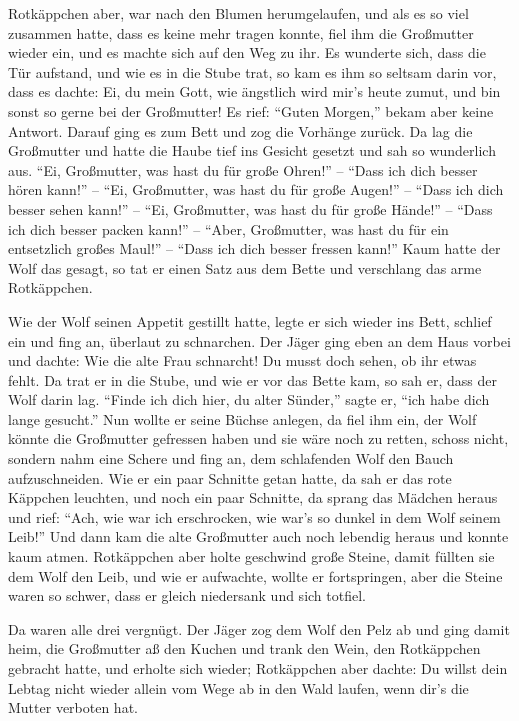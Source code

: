 \documentclass[version=last,paper=A4,fontsize=20pt,DIV=16]{scrartcl}
\newcommand{\gf}[1]{\enquote{\sffamily #1}}
\begin{document}
Rotkäppchen aber, war nach den Blumen herumgelaufen, und als es so viel zusammen hatte, dass es keine mehr tragen konnte, fiel ihm die Großmutter wieder ein, und es machte sich auf den Weg zu ihr. Es wunderte sich, dass die Tür aufstand, und wie es in die Stube trat, so kam es ihm so seltsam darin vor, dass es dachte: Ei, du mein Gott, wie ängstlich wird mir's heute zumut, und bin sonst so gerne bei der Großmutter! Es rief: \gf{Guten Morgen,} bekam aber keine Antwort. Darauf ging es zum Bett und zog die Vorhänge zurück. Da lag die Großmutter und hatte die Haube tief ins Gesicht gesetzt und sah so wunderlich aus. \gf{Ei, Großmutter, was hast du für große Ohren!} -- \gf{Dass ich dich besser hören kann!} -- \gf{Ei, Großmutter, was hast du für große Augen!} -- \gf{Dass ich dich besser sehen kann!} -- \gf{Ei, Großmutter, was hast du für große Hände!} -- \gf{Dass ich dich besser packen kann!} -- \gf{Aber, Großmutter, was hast du für ein entsetzlich großes Maul!} -- \gf{Dass ich dich besser fressen kann!} Kaum hatte der Wolf das gesagt, so tat er einen Satz aus dem Bette und verschlang das arme Rotkäppchen.


Wie der Wolf seinen Appetit gestillt hatte, legte er sich wieder ins Bett, schlief ein und fing an, überlaut zu schnarchen. Der Jäger ging eben an dem Haus vorbei und dachte: Wie die alte Frau schnarcht! Du musst doch sehen, ob ihr etwas fehlt. Da trat er in die Stube, und wie er vor das Bette kam, so sah er, dass der Wolf darin lag. \gf{Finde ich dich hier, du alter Sünder,} sagte er, \gf{ich habe dich lange gesucht.} Nun wollte er seine Büchse anlegen, da fiel ihm ein, der Wolf könnte die Großmutter gefressen haben und sie wäre noch zu retten, schoss nicht, sondern nahm eine Schere und fing an, dem schlafenden Wolf den Bauch aufzuschneiden. Wie er ein paar Schnitte getan hatte, da sah er das rote Käppchen leuchten, und noch ein paar Schnitte, da sprang das Mädchen heraus und rief: \gf{Ach, wie war ich erschrocken, wie war's so dunkel in dem Wolf seinem Leib!} Und dann kam die alte Großmutter auch noch lebendig heraus und konnte kaum atmen. Rotkäppchen aber holte geschwind große Steine, damit füllten sie dem Wolf den Leib, und wie er aufwachte, wollte er fortspringen, aber die Steine waren so schwer, dass er gleich niedersank und sich totfiel.


Da waren alle drei vergnügt. Der Jäger zog dem Wolf den Pelz ab und ging damit heim, die Großmutter aß den Kuchen und trank den Wein, den Rotkäppchen gebracht hatte, und erholte sich wieder; Rotkäppchen aber dachte: Du willst dein Lebtag nicht wieder allein vom Wege ab in den Wald laufen, wenn dir's die Mutter verboten hat.
\end{document}
